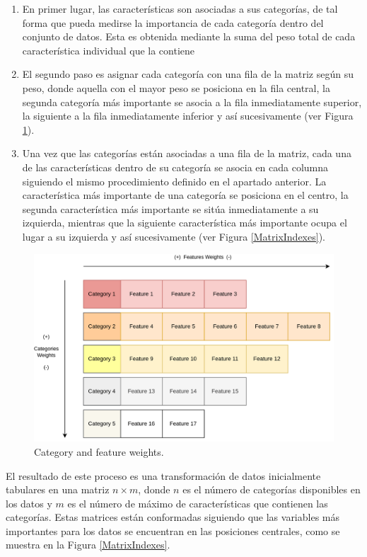 \documentclass{uathesis-es}
\begin{document}
\begin{enumerate}
    \item En primer lugar, las características son asociadas a sus categorías, de tal forma que pueda medirse la importancia de cada categoría dentro del conjunto de datos. Esta es obtenida mediante la suma del peso total de cada característica individual que la contiene
    \item El segundo paso es asignar cada categoría con una fila de la matriz según su peso, donde aquella con el mayor peso se posiciona en la fila central, la segunda categoría más importante se asocia a la fila inmediatamente superior, la siguiente a la fila inmediatamente inferior y así sucesivamente (ver Figura \ref{CategoriesFeaturesWeights}).
    \item Una vez que las categorías están asociadas a una fila de la matriz, cada una de las características dentro de su categoría se asocia en cada columna siguiendo el mismo procedimiento definido en el apartado anterior. La característica más importante de una categoría se posiciona en el centro, la segunda característica más importante se sitúa inmediatamente a su izquierda, mientras que la siguiente característica más importante ocupa el lugar a su izquierda y así sucesivamente (ver Figura \ref{MatrixIndexes}).
\end{enumerate}


\begin{figure}[H]
    \centering
    \includegraphics[width=14cm]{Figures/indexing_positions_1_2.png}
    \caption{Category and feature weights.}
    \label{CategoriesFeaturesWeights}
\end{figure}

El resultado de este proceso es una transformación de datos inicialmente tabulares en una matriz $n \times m$, donde $n$ es el número de categorías disponibles en los datos y $m$ es el número de máximo de características que contienen las categorías. Estas matrices están conformadas siguiendo que las variables más importantes para los datos se encuentran en las posiciones centrales, como se muestra en la Figura \ref{MatrixIndexes}.
\end{document}
